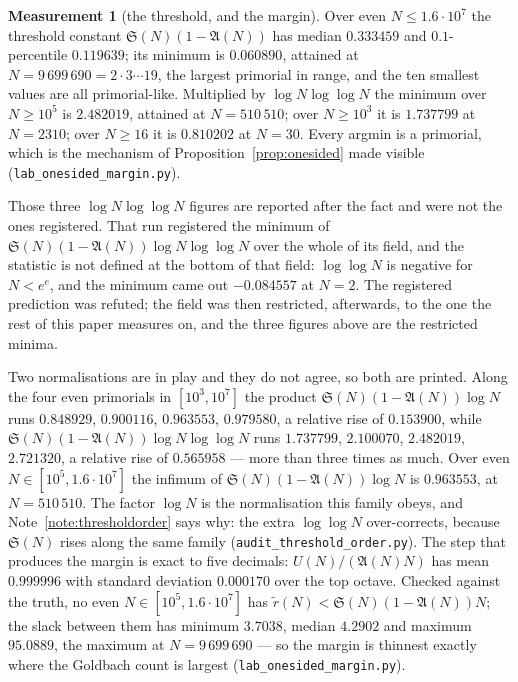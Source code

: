 \documentclass[11pt,a4paper]{article}
\theoremstyle{plain}
\theoremstyle{definition}
\newtheorem{measurement}[theorem]{Measurement}
\theoremstyle{remark}
\renewcommand{\SS}{\mathfrak{S}}
\newcommand{\AAA}{\mathfrak{A}}
\begin{document}
\begin{measurement}[the threshold, and the margin]\label{meas:margin}
Over even $N\le1.6\cdot10^7$ the threshold constant
$\SS(N)(1-\AAA(N))$ has median $0.333459$ and $0.1$-percentile
$0.119639$; its minimum is $0.060890$, attained at
$N=9\,699\,690=2\cdot3\cdots19$, the largest primorial in range, and
the ten smallest values are all primorial-like. Multiplied by
$\log N\log\log N$ the minimum over $N\ge10^5$ is $2.482019$, attained
at $N=510\,510$; over $N\ge10^3$ it is $1.737799$ at $N=2310$; over
$N\ge16$ it is $0.810202$ at $N=30$. Every argmin is a primorial,
which is the mechanism of Proposition~\ref{prop:onesided} made
visible (\texttt{lab\_onesided\_margin.py}).

Those three $\log N\log\log N$ figures are reported after the fact and
were not the ones registered. That run registered the minimum of
$\SS(N)(1-\AAA(N))\log N\log\log N$ over the whole of its field, and
the statistic is not defined at the bottom of that field: $\log\log N$
is negative for $N<e^{e}$, and the minimum came out $-0.084557$ at
$N=2$. The registered prediction was refuted; the field was then
restricted, afterwards, to the one the rest of this paper measures on,
and the three figures above are the restricted minima.

Two normalisations are in play and they do not agree, so both are
printed. Along the four even primorials in $[10^3,10^7]$ the product
$\SS(N)(1-\AAA(N))\log N$ runs $0.848929$, $0.900116$, $0.963553$,
$0.979580$, a relative rise of $0.153900$, while
$\SS(N)(1-\AAA(N))\log N\log\log N$ runs $1.737799$, $2.100070$,
$2.482019$, $2.721320$, a relative rise of $0.565958$ --- more than
three times as much. Over even $N\in[10^5,1.6\cdot10^7]$ the infimum
of $\SS(N)(1-\AAA(N))\log N$ is $0.963553$, at $N=510\,510$. The
factor $\log N$ is the normalisation this family obeys, and
Note~\ref{note:thresholdorder} says why: the extra $\log\log N$
over-corrects, because $\SS(N)$ rises along the same family
(\texttt{audit\_threshold\_order.py}). The step that produces the
margin is exact to five
decimals: $U(N)/(\AAA(N)N)$ has mean $0.999996$ with standard
deviation $0.000170$ over the top octave. Checked against the truth,
no even $N\in[10^5,1.6\cdot10^7]$ has
$\tilde r(N)<\SS(N)(1-\AAA(N))N$; the slack between them has minimum
$3.7038$, median $4.2902$ and maximum $95.0889$, the maximum at
$N=9\,699\,690$ --- so the margin is thinnest exactly where the
Goldbach count is largest
(\texttt{lab\_onesided\_margin.py}).
\end{measurement}
\end{document}
